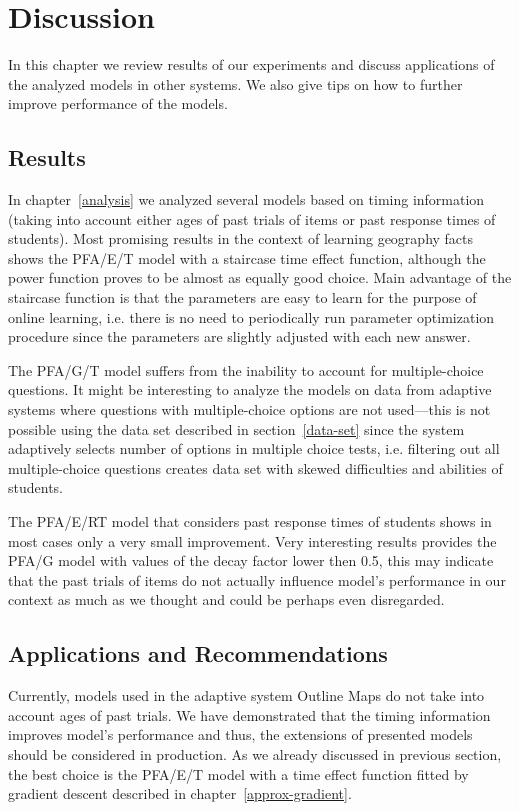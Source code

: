 \chapter{Discussion}

In this chapter we review results of our experiments and discuss applications of the analyzed models in other systems. We also give tips on how to further improve performance of the models.

\section{Results}

In chapter~\ref{analysis} we analyzed several models based on timing information (taking into account either ages of past trials of items or past response times of students). Most promising results in the context of learning geography facts shows the PFA/E/T model with a staircase time effect function, although the power function proves to be almost as equally good choice. Main advantage of the staircase function is that the parameters are easy to learn for the purpose of online learning, i.e. there is no need to periodically run parameter optimization procedure since the parameters are slightly adjusted with each new answer.

The PFA/G/T model suffers from the inability to account for multiple-choice questions. It might be interesting to analyze the models on data from adaptive systems where questions with multiple-choice options are not used---this is not possible using the data set described in section~\ref{data-set} since the system adaptively selects number of options in multiple choice tests, i.e. filtering out all multiple-choice questions creates data set with skewed difficulties and abilities of students.

The PFA/E/RT model that considers past response times of students shows in most cases only a very small improvement. Very interesting results provides the PFA/G model with values of the decay factor lower then 0.5, this may indicate that the past trials of items do not actually influence model's performance in our context as much as we thought and could be perhaps even disregarded.

\section{Applications and Recommendations}

Currently, models used in the adaptive system Outline Maps do not take into account ages of past trials. We have demonstrated that the timing information improves model's performance and thus, the extensions of presented models should be considered in production. As we already discussed in previous section, the best choice is the PFA/E/T model with a time effect function fitted by gradient descent described in chapter~\ref{approx-gradient}.


